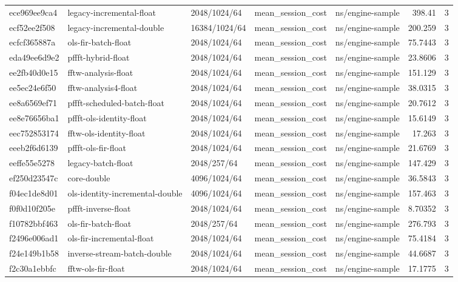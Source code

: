\begin{longtable}{lllllrr}
ece969ee9ca4 & legacy-incremental-float & 2048/1024/64 & mean\_session\_cost & ns/engine-sample & 398.41 & 3 \\
ecf52ee2f508 & legacy-incremental-double & 16384/1024/64 & mean\_session\_cost & ns/engine-sample & 200.259 & 3 \\
ecfcf365887a & ols-fir-batch-float & 2048/1024/64 & mean\_session\_cost & ns/engine-sample & 75.7443 & 3 \\
eda49ee6d9e2 & pffft-hybrid-float & 2048/1024/64 & mean\_session\_cost & ns/engine-sample & 23.8606 & 3 \\
ee2fb40d0e15 & fftw-analysis-float & 2048/1024/64 & mean\_session\_cost & ns/engine-sample & 151.129 & 3 \\
ee5ec24e6f50 & fftw-analysis4-float & 2048/1024/64 & mean\_session\_cost & ns/engine-sample & 38.0315 & 3 \\
ee8a6569ef71 & pffft-scheduled-batch-float & 2048/1024/64 & mean\_session\_cost & ns/engine-sample & 20.7612 & 3 \\
ee8e76656ba1 & pffft-ols-identity-float & 2048/1024/64 & mean\_session\_cost & ns/engine-sample & 15.6149 & 3 \\
eec752853174 & fftw-ols-identity-float & 2048/1024/64 & mean\_session\_cost & ns/engine-sample & 17.263 & 3 \\
eeeb2f6d6139 & pffft-ols-fir-float & 2048/1024/64 & mean\_session\_cost & ns/engine-sample & 21.6769 & 3 \\
eeffe55e5278 & legacy-batch-float & 2048/257/64 & mean\_session\_cost & ns/engine-sample & 147.429 & 3 \\
ef250d23547c & core-double & 4096/1024/64 & mean\_session\_cost & ns/engine-sample & 36.5843 & 3 \\
f04ec1de8d01 & ols-identity-incremental-double & 4096/1024/64 & mean\_session\_cost & ns/engine-sample & 157.463 & 3 \\
f0f0d10f205e & pffft-inverse-float & 2048/1024/64 & mean\_session\_cost & ns/engine-sample & 8.70352 & 3 \\
f10782bbf463 & ols-fir-batch-float & 2048/257/64 & mean\_session\_cost & ns/engine-sample & 276.793 & 3 \\
f2496e006ad1 & ols-fir-incremental-float & 2048/1024/64 & mean\_session\_cost & ns/engine-sample & 75.4184 & 3 \\
f24e149b1b58 & inverse-stream-batch-double & 2048/1024/64 & mean\_session\_cost & ns/engine-sample & 44.6687 & 3 \\
f2c30a1ebbfc & fftw-ols-fir-float & 2048/1024/64 & mean\_session\_cost & ns/engine-sample & 17.1775 & 3 \\

\end{longtable}
